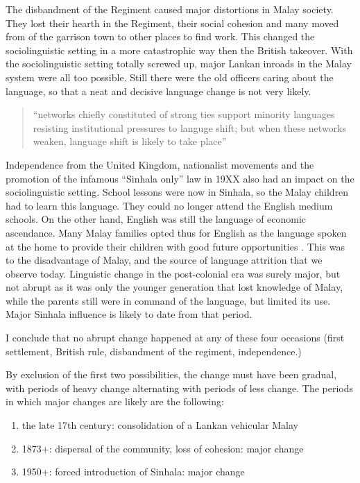 The disbandment of the Regiment caused major distortions in Malay
society. They lost their hearth in the Regiment, their social
cohesion and many moved from of the garrison town to other places
to find work. This changed the sociolinguistic setting in a more
catastrophic way then the British takeover. With the
sociolinguistic setting totally screwed up\kuckn, major Lankan
inroads in the Malay system were all too possible. Still there
were the old officers caring about the language, so that a neat
and decisive language change is not very likely.

\begin{quote}
	``networks chiefly constituted of strong ties support minority languages resisting institutional pressures to languge shift; but when these networks weaken, language shift is likely to take place''\citep[124]{MilroyEtAl2003}
\end{quote}


Independence from the United Kingdom, nationalist movements and the promotion of the infamous ``Sinhala only'' law in 19XX  \citep{abc}  also had an impact on the sociolinguistic setting. School lessons were now in Sinhala, so the Malay children had to learn this language. They could no longer attend the English medium schools\kuckn. On the other hand, English was still the language of economic ascendance. Many Malay families opted thus for English as the language spoken at the home to provide their children with good future opportunities \citep{Saldin2003}. This was to the disadvantage of Malay, and the source of language attrition that we observe today. Linguistic change in the post-colonial era was surely major, but not abrupt as it was only the younger generation that lost knowledge of Malay, while the parents still were in command of the language, but limited its use. Major Sinhala influence is likely to date from that period.

I conclude that no abrupt change happened at any of these four
occasions (first settlement, British rule, disbandment of the
regiment, independence.)

By exclusion of the first two possibilities, the change must have been gradual, with periods of heavy change alternating with periods of less change. The periods in which major changes are likely are the following:
 
\begin{enumerate}
    \item the late 17th century: consolidation of a Lankan vehicular Malay
    \item 1873+: dispersal of the community, loss of cohesion: major change
    \item 1950+: forced introduction of Sinhala: major change
\end{enumerate}

